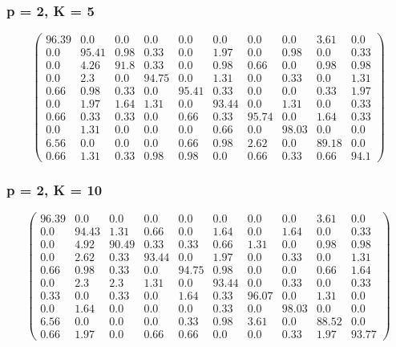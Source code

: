 \begin{appendices}
\subsubsection*{p = 2, K = 5}
$$\begin{pmatrix}
96.39&0.0&0.0&0.0&0.0&0.0&0.0&0.0&3.61&0.0\\
0.0&95.41&0.98&0.33&0.0&1.97&0.0&0.98&0.0&0.33\\
0.0&4.26&91.8&0.33&0.0&0.98&0.66&0.0&0.98&0.98\\
0.0&2.3&0.0&94.75&0.0&1.31&0.0&0.33&0.0&1.31\\
0.66&0.98&0.33&0.0&95.41&0.33&0.0&0.0&0.33&1.97\\
0.0&1.97&1.64&1.31&0.0&93.44&0.0&1.31&0.0&0.33\\
0.66&0.33&0.33&0.0&0.66&0.33&95.74&0.0&1.64&0.33\\
0.0&1.31&0.0&0.0&0.0&0.66&0.0&98.03&0.0&0.0\\
6.56&0.0&0.0&0.0&0.66&0.98&2.62&0.0&89.18&0.0\\
0.66&1.31&0.33&0.98&0.98&0.0&0.66&0.33&0.66&94.1
\end{pmatrix}$$

\subsubsection*{p = 2, K = 10}
$$\begin{pmatrix}
96.39&0.0&0.0&0.0&0.0&0.0&0.0&0.0&3.61&0.0\\
0.0&94.43&1.31&0.66&0.0&1.64&0.0&1.64&0.0&0.33\\
0.0&4.92&90.49&0.33&0.33&0.66&1.31&0.0&0.98&0.98\\
0.0&2.62&0.33&93.44&0.0&1.97&0.0&0.33&0.0&1.31\\
0.66&0.98&0.33&0.0&94.75&0.98&0.0&0.0&0.66&1.64\\
0.0&2.3&2.3&1.31&0.0&93.44&0.0&0.33&0.0&0.33\\
0.33&0.0&0.33&0.0&1.64&0.33&96.07&0.0&1.31&0.0\\
0.0&1.64&0.0&0.0&0.0&0.33&0.0&98.03&0.0&0.0\\
6.56&0.0&0.0&0.0&0.33&0.98&3.61&0.0&88.52&0.0\\
0.66&1.97&0.0&0.66&0.66&0.0&0.0&0.33&1.97&93.77
\end{pmatrix}$$


\end{appendices}
